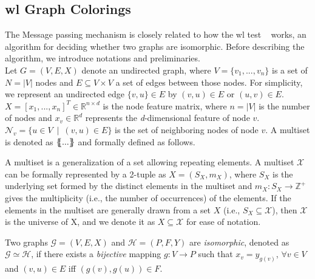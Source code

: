 \subsection{\acl*{wl} Graph Colorings}
\label{sec:related:character:wl}
The Message passing mechanism is closely related to how the \acf{wl} test ~\cite{Weisfeiler1968,Damke2020,Huang2022} works, an algorithm for deciding whether two graphs are isomorphic.
Before describing the algorithm, we introduce notations and preliminaries.\\
Let $G = (V,E, X)$ denote an undirected graph, where $V =\{v_{1},...,v_{n}\}$ is a set of $ N = |V|$ nodes and $E \subseteq V\times V $ a set of edges between those nodes. For simplicity, we represent an undirected edge $\{v,u\} \in E$ by $(v,u) \in E$ or $(u,v)\in E$. $X= [x_{1},...,x_{n}]^{T} \in \mathbb{R}^{n \times d}$ is the node feature matrix, where $n = |V|$ is the number of nodes and $x_{v} \in \mathbb{R}^{d}$ represents the \textit{d}-dimensional feature of node $v$. $\mathcal{N}_{v}= \{u \in V\ \mid \ (v,u) \in E\}$ is the set of neighboring nodes of node $v$. A multiset is denoted
as $\ldblbrace...\rdblbrace$ and formally defined as follows.
\begin{defn}[Multiset]
    A multiset is a generalization of a set allowing repeating elements.
    A multiset $\mathcal{X}$ can be formally represented by a 2-tuple as $X = (S_{X}, m_{X})$, where $S_{X}$ is the
    underlying set formed by the distinct elements in the multiset and $m_{X}:S_{X} \rightarrow
        \mathbb{Z}^{+}$ gives the multiplicity (i.e., the number of occurrences) of the elements.
    If the elements in the multiset are generally drawn from a set $X$ (i.e., $S_{X} \subseteq \mathcal{X}$), then $\mathcal{X}$ is the universe of X, and we denote it as $X \subseteq \mathcal{X}$ for ease of notation.
\end{defn}
\begin{defn}[Isomorphism]
    Two graphs $\mathcal{G}= (V,E,X)$ and $\mathcal{H}= (P,F,Y)$ are \textit{isomorphic}, denoted as $\mathcal{G} \simeq \mathcal{H}$, if there exists a \textit{bijective} mapping $g: V \rightarrow P$ such that $x_{v}= y_{g(v)}$, $\forall v \in V$ and $(v,u) \in E$ iff $(g(v),g(u)) \in F$.
\end{defn}
